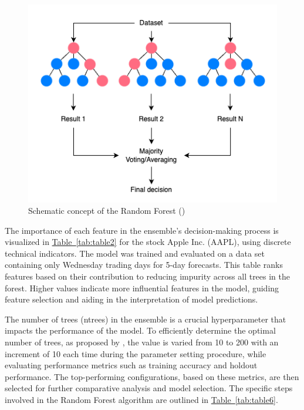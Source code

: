 \documentclass[aodsor,preprint]{imsart}
\numberwithin{equation}{section}
\theoremstyle{plain}
\begin{document}
\begin{figure}[H]
  \centering
  \includegraphics[width=\textwidth]{plots/rf.png}
  \caption{Schematic concept of the Random Forest (\cite{saetia2022})}
  \label{fig:plotx}
\end{figure}


The importance of each feature in the ensemble's decision-making process is visualized in \hyperref[tab:table2]{Table~\ref*{tab:table2}} for the stock Apple Inc. (AAPL), using discrete technical indicators. The model was trained and evaluated on a data set containing only Wednesday trading days for 5-day forecasts. This table ranks features based on their contribution to reducing impurity across all trees in the forest. Higher values indicate more influential features in the model, guiding feature selection and aiding in the interpretation of model predictions.




The number of trees (ntrees) in the ensemble is a crucial hyperparameter that impacts the performance of the model. To efficiently determine the optimal number of trees, as proposed by \cite{patel2015}, the value is varied from 10 to 200 with an increment of 10 each time during the parameter setting procedure, while evaluating performance metrics such as training accuracy and holdout performance. The top-performing configurations, based on these metrics, are then selected for further comparative analysis and model selection. The specific steps involved in the Random Forest algorithm are outlined in \hyperref[tab:table6]{Table~\ref*{tab:table6}}.
\end{document}
